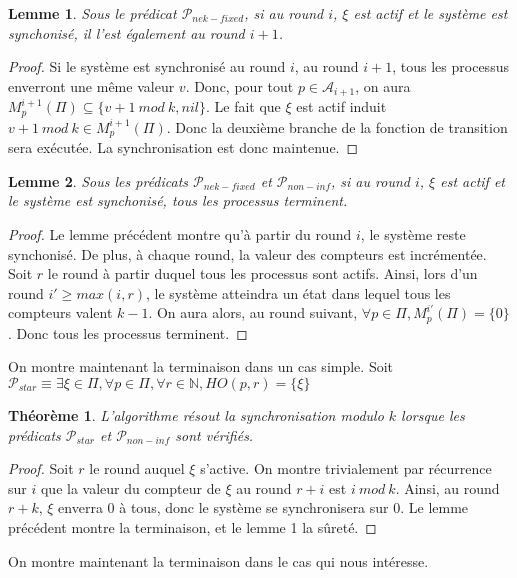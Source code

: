 \documentclass{article}
\newtheorem{lemma}{Lemme}
\newtheorem{theorem}{Théorème}
\begin{document}
\begin{lemma}
	Sous le prédicat $\mathcal{P}_{nek-fixed}$,
	si au round $i$, $\xi$ est actif et le système est synchonisé, il l'est également au round $i+1$.
\end{lemma}
\begin{proof}
	Si le système est synchronisé au round $i$, au round $i+1$, tous les processus enverront une même valeur $v$.
	Donc, pour tout $p \in \mathcal{A}_{i+1}$, on aura $M_p^{i+1}(\Pi) \subseteq \{v+1~mod~k, nil\}$.
	Le fait que $\xi$ est actif induit $v+1~mod~k \in M_p^{i+1}(\Pi)$.
	Donc la deuxième branche de la fonction de transition sera exécutée.
	La synchronisation est donc maintenue.
\end{proof}
\begin{lemma}
	Sous les prédicats $\mathcal{P}_{nek-fixed}$ et $\mathcal{P}_{non-inf}$,
	si au round $i$, $\xi$ est actif et le système est synchonisé, tous les processus terminent.
\end{lemma}
\begin{proof}
	Le lemme précédent montre qu'à partir du round $i$, le système reste synchonisé. De plus, à chaque round, la valeur des compteurs est incrémentée.
	Soit $r$ le round à partir duquel tous les processus sont actifs.
	Ainsi, lors d'un round $i' \geq max(i, r)$, le système atteindra un état dans lequel tous les compteurs valent $k-1$.
	On aura alors, au round suivant, $\forall p \in \Pi, M_p^{i'}(\Pi) = \{0\}$.
	Donc tous les processus terminent.
\end{proof}

On montre maintenant la terminaison dans un cas simple.
Soit $\mathcal{P}_{star} \equiv \exists \xi \in \Pi, \forall p \in \Pi, \forall r \in \mathds{N}, HO(p, r) = \{\xi\}$

\begin{theorem}
	L'algorithme résout la synchronisation modulo $k$ lorsque les prédicats $\mathcal{P}_{star}$ et $\mathcal{P}_{non-inf}$ sont vérifiés.
\end{theorem}
\begin{proof}
	Soit $r$ le round auquel $\xi$ s'active.
	On montre trivialement par récurrence sur $i$ que la valeur du compteur de $\xi$ au round $r+i$ est $i~mod~k$.
	Ainsi, au round $r+k$, $\xi$ enverra 0 à tous, donc le système se synchronisera sur 0.
	Le lemme précédent montre la terminaison, et le lemme 1 la sûreté.
\end{proof}

On montre maintenant la terminaison dans le cas qui nous intéresse.
\end{document}
